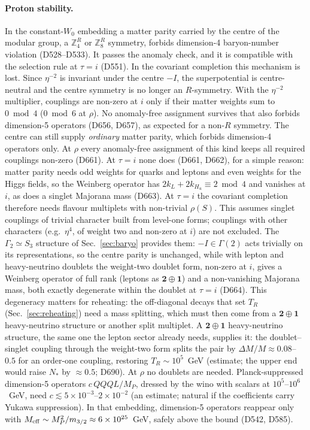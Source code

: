 \documentclass[aps,prd,twocolumn,superscriptaddress,nofootinbib,floatfix]{revtex4-2}
\begin{document}
\paragraph{Proton stability.} In the constant-$W_0$ embedding a matter parity carried by the centre of the modular group, a $\mathbb{Z}_4^R$ or $\mathbb{Z}_8^R$ symmetry, forbids dimension-4 baryon-number violation (D528--D533). It passes the anomaly check, and it is compatible with the selection rule at $\tau = i$ (D551). In the covariant completion this mechanism is lost. Since $\eta^{-2}$ is invariant under the centre $-I$, the superpotential is centre-neutral and the centre symmetry is no longer an $R$-symmetry. With the $\eta^{-2}$ multiplier, couplings are non-zero at $i$ only if their matter weights sum to $0\bmod4$ ($0\bmod6$ at $\rho$). No anomaly-free assignment survives that also forbids dimension-5 operators (D656, D657), as expected for a non-$R$ symmetry. The centre can still supply \emph{ordinary} matter parity, which forbids dimension-4 operators only. At $\rho$ every anomaly-free assignment of this kind keeps all required couplings non-zero (D661). At $\tau=i$ none does (D661, D662), for a simple reason: matter parity needs odd weights for quarks and leptons and even weights for the Higgs fields, so the Weinberg operator has $2k_L+2k_{H_u}\equiv2\bmod4$ and vanishes at $i$, as does a singlet Majorana mass (D663). At $\tau=i$ the covariant completion therefore needs flavour multiplets with non-trivial $\rho(S)$. This assumes singlet couplings of trivial character built from level-one forms; couplings with other characters (e.g.\ $\eta^4$, of weight two and non-zero at $i$) are not excluded. The $\Gamma_2\simeq S_3$ structure of Sec.~\ref{sec:baryo} provides them: $-I\in\Gamma(2)$ acts trivially on its representations, so the centre parity is unchanged, while with lepton and heavy-neutrino doublets the weight-two doublet form, non-zero at $i$, gives a Weinberg operator of full rank (leptons as $\mathbf2\oplus\mathbf1$) and a non-vanishing Majorana mass, both exactly degenerate within the doublet at $\tau=i$ (D664). This degeneracy matters for reheating: the off-diagonal decays that set $T_R$ (Sec.~\ref{sec:reheating}) need a mass splitting, which must then come from a $\mathbf2\oplus\mathbf1$ heavy-neutrino structure or another split multiplet. A $\mathbf2\oplus\mathbf1$ heavy-neutrino structure, the same one the lepton sector already needs, supplies it: the doublet--singlet coupling through the weight-two form splits the pair by $\Delta M/M\approx0.08$--$0.5$ for an order-one coupling, restoring $T_R\sim10^5$~GeV (estimate; the upper end would raise $N_*$ by $\approx0.5$; D690). At $\rho$ no doublets are needed. Planck-suppressed dimension-5 operators $c\,QQQL/M_P$, dressed by the wino with scalars at $10^5$--$10^6$~GeV, need $c\lesssim5\times10^{-3}$--$2\times10^{-2}$ (an estimate; natural if the coefficients carry Yukawa suppression). In that embedding, dimension-5 operators reappear only with $M_{\rm eff} \sim M_P^2/m_{3/2}\approx6\times10^{25}$~GeV, safely above the bound (D542, D585).
\end{document}
